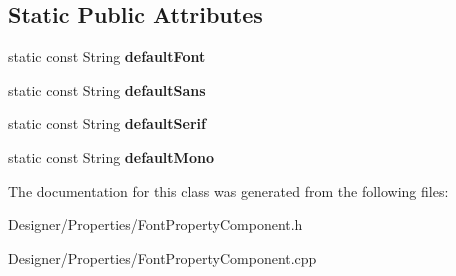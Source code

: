 \subsection*{Static Public Attributes}
\begin{DoxyCompactItemize}
\item 
\hypertarget{class_font_property_component_a70b8b855124183179d76caf5c60e8377}{static const String {\bfseries default\-Font}}\label{class_font_property_component_a70b8b855124183179d76caf5c60e8377}

\item 
\hypertarget{class_font_property_component_a3279e79714cbf392f9851fab5d49a5f4}{static const String {\bfseries default\-Sans}}\label{class_font_property_component_a3279e79714cbf392f9851fab5d49a5f4}

\item 
\hypertarget{class_font_property_component_a334be8c1959ab0c870c1378ff1cea4b7}{static const String {\bfseries default\-Serif}}\label{class_font_property_component_a334be8c1959ab0c870c1378ff1cea4b7}

\item 
\hypertarget{class_font_property_component_a939f3dad9a05faf4e12169679a7faefa}{static const String {\bfseries default\-Mono}}\label{class_font_property_component_a939f3dad9a05faf4e12169679a7faefa}

\end{DoxyCompactItemize}


The documentation for this class was generated from the following files\-:\begin{DoxyCompactItemize}
\item 
Designer/\-Properties/Font\-Property\-Component.\-h\item 
Designer/\-Properties/Font\-Property\-Component.\-cpp\end{DoxyCompactItemize}
